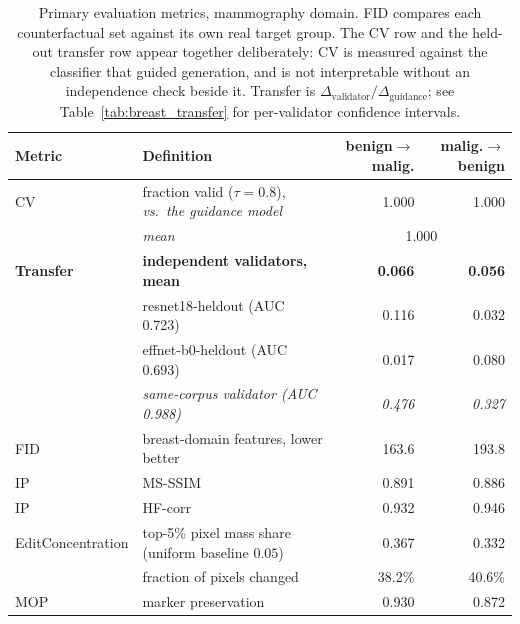\begin{table}[h]
\centering
\caption[Breast-domain primary metrics]{Primary evaluation metrics, mammography domain. FID compares each
counterfactual set against its own real target group. The CV row and the
held-out transfer row appear together deliberately: CV is measured against
the classifier that guided generation, and is not interpretable without an
independence check beside it. Transfer is
$\Delta_{\text{validator}}/\Delta_{\text{guidance}}$; see
Table~\ref{tab:breast_transfer} for per-validator confidence intervals.}
\label{tab:breast_results}
\begin{tabular}{@{}llrr@{}}
\toprule
\textbf{Metric} & \textbf{Definition} & \textbf{benign$\to$malig.} & \textbf{malig.$\to$benign} \\
\midrule
CV   & fraction valid ($\tau = 0.8$), \emph{vs.\ the guidance model} & 1.000 & 1.000 \\
     & \textit{mean}                       & \multicolumn{2}{c}{1.000} \\
\addlinespace
\textbf{Transfer} & \textbf{independent validators, mean} & \textbf{0.066} & \textbf{0.056} \\
     & \quad resnet18-heldout (AUC 0.723)  & 0.116 & 0.032 \\
     & \quad effnet-b0-heldout (AUC 0.693) & 0.017 & 0.080 \\
     & \quad \textit{same-corpus validator (AUC 0.988)} & \textit{0.476} & \textit{0.327} \\
\addlinespace
FID  & breast-domain features, lower better & 163.6 & 193.8 \\
IP   & MS-SSIM                             & 0.891 & 0.886 \\
IP   & HF-corr                             & 0.932 & 0.946 \\
EditConcentration & top-5\% pixel mass share (uniform baseline $0.05$) & 0.367 & 0.332 \\
     & fraction of pixels changed          & 38.2\% & 40.6\% \\
MOP  & marker preservation                 & 0.930 & 0.872 \\
\bottomrule
\end{tabular}
\end{table}

